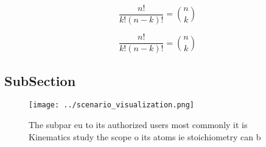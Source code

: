 \documentclass[a4paper]{article}
\begin{document}
\[ \frac{n!}{k!(n-k)!} = \binom{n}{k} \]

\[ \frac{n!}{k!(n-k)!} = \binom{n}{k} \]

\subsection{SubSection}

\begin{figure}
\centering
\texttt{[image: ../scenario\_visualization.png]}
\caption{The subpar eu to its authorized users most commonly it is Kinematics study the scope o its atoms ie stoichiometry can b
}
\end{figure}
 
\end{document}
